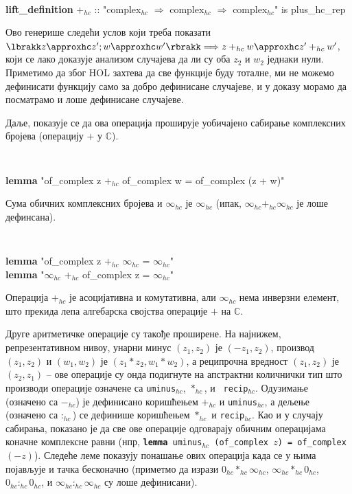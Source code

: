 {\tt
\begin{tabbing}
{\bf lift\_definition} $+_{hc}$ :: "complex$_{hc}$ $\Rightarrow$ complex$_{hc}$ $\Rightarrow$ complex$_{hc}$" is plus\_hc\_rep
\end{tabbing}
}
\noindent Ово генерише следећи услов који треба показати $\lbrakk z
\approxhc z'; w \approxhc w'\rbrakk \Longrightarrow z +_{hc} w
\approxhc z' +_{hc} w'$, који се лако доказује анализом случајева да
ли су оба $z_2$ и $w_2$ једнаки нули. Приметимо да због HOL захтева да
све функције буду тоталне, ми не можемо дефинисати функцију само за
добро дефинисане случајеве, и у доказу морамо да посматрамо и лоше
дефинисане случајеве.

Даље, показује се да ова операција проширује уобичајено сабирање
комплексних бројева (операцију $+$ у $\mathbb{C}$).

{\tt
\begin{tabbing}
{\bf lemma} "of\_complex z $+_{hc}$ of\_complex w = of\_complex (z + w)"
\end{tabbing}
}

\noindent Сума обичних комплексних бројева и $\infty_{hc}$ је
$\infty_{hc}$ (ипак, $\infty_{hc} +_{hc} \infty_{hc}$ је лоше
дефинсана).

{\tt
\begin{tabbing}
{\bf lemma} "of\_complex z $+_{hc}$ $\infty_{hc}$ = $\infty_{hc}$"\\
{\bf lemma} "$\infty_{hc}$ $+_{hc}$ of\_complex z = $\infty_{hc}$"
\end{tabbing}
}

Операција $+_{hc}$ је асоцијативна и комутативна, али $\infty_{hc}$
нема инверзни елемент, што прекида лепа алгебарска својства операције
$+$ на $\mathbb{C}$.

Друге аритметичке операције су такође проширене. На најнижем,
репрезентативном нивоу, унарни минус $(z_1, z_2)$ је $(-z_1, z_2)$,
производ $(z_1, z_2)$ и $(w_1, w_2)$ је $(z_1*z_2, w_1*w_2)$, а
реципрочна вредност $(z_1, z_2)$ је $(z_2, z_1)$ -- ове операције су
онда подигнуте на апстрактни количнички тип што производи операције
означене са {\tt uminus}$_{hc}$, $*_{hc}$, и {\tt
  recip}$_{hc}$. Одузимање (означено са $-_{hc}$) је дефинисано
коришћењем $+_{hc}$ и {\tt uminus}$_{hc}$, а дељење (означено са
$:_{hc}$) се дефинише коришћењем $*_{hc}$ и {\tt recip}$_{hc}$. Као и
у случају сабирања, показано је да све ове операције одговарају
обичним операцијама коначне комплексне равни (нпр, {\tt {\bf lemma}
  uminus$_{hc}$ (of\_complex $z$) = of\_complex $(-z)$}). Следеће леме
показују понашање ових операција када се у њима појављује и тачка
бесконачно (приметмо да изрази $0_{hc} *_{hc} \infty_{hc}$,
$\infty_{hc} *_{hc} 0_{hc}$, $0_{hc} :_{hc} 0_{hc}$, и $\infty_{hc}
:_{hc} \infty_{hc}$ су лоше дефинисани).

